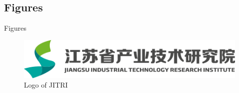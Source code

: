 \documentclass{libs/JITRI_format}
\begin{document}


\subsection{Figures}
\begin{frame}{Figures}
    \begin{figure}
        \centering
        \includegraphics[scale=0.5]{images/JITRI_logo.png}
        \caption{Logo of JITRI}
        \label{fig:JITRI_logo}
    \end{figure}
\end{frame}
\end{document}
